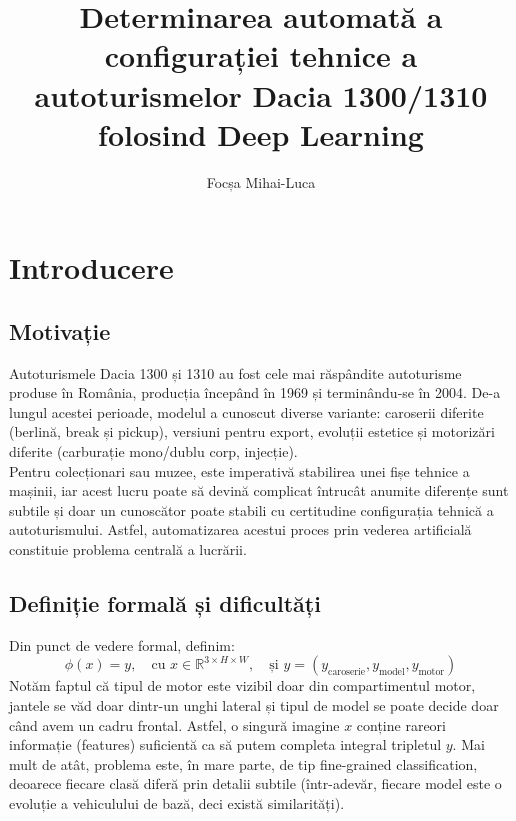 \documentclass[12pt, a4paper, openany]{book}
\title{Determinarea automată a configurației tehnice a autoturismelor Dacia 1300/1310 folosind Deep Learning}
\author{Focșa Mihai-Luca}
\begin{document}




\addtocounter{page}{1}



\tableofcontents

\pagestyle{main}
\let\ps@plain\ps@main

\chapter{Introducere}
\label{ch:introducere_preliminarii}

\label{sec:Introducere}

\section{Motivație}
\label{subsec:motivatie}

\hspace*{15pt} Autoturismele Dacia 1300 și 1310 au fost cele mai răspândite autoturisme produse în România, producția începând în 1969 și terminându-se în 2004. De-a lungul acestei perioade, modelul a cunoscut diverse variante: caroserii diferite (berlină, break și pickup), versiuni pentru export, evoluții estetice și motorizări diferite (carburație mono/dublu corp, injecție). \\
\indent Pentru colecționari sau muzee, este imperativă stabilirea unei fișe tehnice a mașinii, iar acest lucru poate să devină complicat întrucât anumite diferențe sunt subtile și doar un cunoscător poate stabili cu certitudine configurația tehnică a autoturismului. Astfel, automatizarea acestui proces prin vederea artificială constituie problema centrală a lucrării.

\section{Definiție formală și dificultăți}
\label{subsec:def_formala}
Din punct de vedere formal, definim:
$$\phi(x) = y, \quad \text{cu } x \in \mathbb{R}^{3 \times H \times W}, \quad \text{și } y = (y_{\text{caroserie}}, y_{\text{model}}, y_{\text{motor}})$$
Notăm faptul că tipul de motor este vizibil doar din compartimentul motor, jantele se văd doar dintr-un unghi lateral și tipul de model se poate decide doar când avem un cadru frontal. Astfel, o singură imagine $x$ conține rareori informație (features) suficientă ca să putem completa integral tripletul $y$. Mai mult de atât, problema este, în mare parte, de tip fine-grained classification, deoarece fiecare clasă diferă prin detalii subtile (într-adevăr, fiecare model este o evoluție a vehiculului de bază, deci există similarități).
\end{document}
